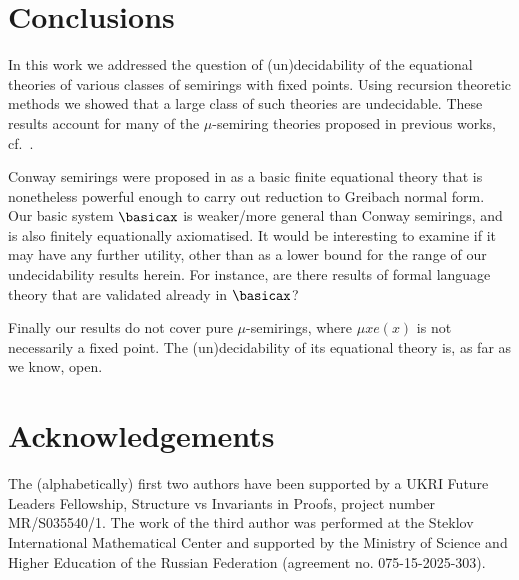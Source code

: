 \documentclass[runningheads]{amsart}
\begin{document}




\section{Conclusions}
\label{sec:concs}
In this work we addressed the question of (un)decidability of the equational theories of various classes of semirings with fixed points. 
Using recursion theoretic methods we showed that a large class of such theories are undecidable.
These results account for many of the $\mu$-semiring theories proposed in previous works, cf.~\cite{Leiss92:ka-with-recursion,EsikLeiss02,EsikLeiss05,GHK13}.

Conway semirings were proposed in \cite{EsikLeiss02,EsikLeiss05} as a basic finite equational theory that is nonetheless powerful enough to carry out reduction to Greibach normal form.
Our basic system $\basicax$ is weaker/more general than Conway semirings, and is also finitely equationally axiomatised. 
It would be interesting to examine if it may have any further utility, other than as a lower bound for the range of our undecidability results herein.
For instance, are there results of formal language theory that are validated already in $\basicax$?

Finally our results do not cover pure $\mu$-semirings, where $\mu x e(x)$ is not necessarily a fixed point. The (un)decidability of its equational theory is, as far as we know, open.


\section*{Acknowledgements}
The (alphabetically) first two authors have been supported by a UKRI Future Leaders Fellowship, Structure vs
Invariants in Proofs, project number MR/S035540/1. The work of the third author was performed at the Steklov International Mathematical Center and supported by the Ministry of Science and Higher Education of the Russian Federation (agreement no. 075-15-2025-303).
\end{document}
